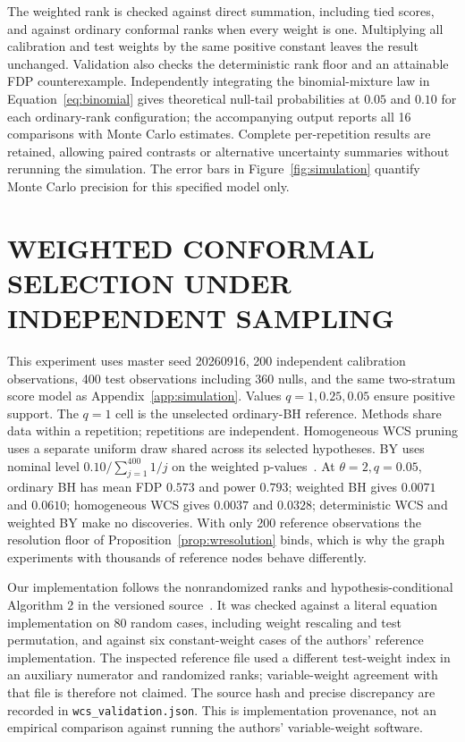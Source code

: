 \documentclass[twoside]{article}
\begin{document}
The weighted rank is checked against direct summation, including tied scores, and against ordinary conformal ranks when every weight is one. Multiplying all calibration and test weights by the same positive constant leaves the result unchanged. Validation also checks the deterministic rank floor and an attainable FDP counterexample. Independently integrating the binomial-mixture law in Equation~\eqref{eq:binomial} gives theoretical null-tail probabilities at $0.05$ and $0.10$ for each ordinary-rank configuration; the accompanying output reports all 16 comparisons with Monte Carlo estimates. Complete per-repetition results are retained, allowing paired contrasts or alternative uncertainty summaries without rerunning the simulation. The error bars in Figure~\ref{fig:simulation} quantify Monte Carlo precision for this specified model only.

\section{WEIGHTED CONFORMAL SELECTION UNDER INDEPENDENT SAMPLING}
\label{app:wcs}
\begin{table}[t]
\centering\small
\caption{Complete WCS comparison under independent sampling. FDP entries give mean (Monte Carlo SE) over 2,000 independent repetitions; power entries are means. At $q=1$, ordinary and weighted BH and both WCS variants coincide in this simulation. Zero-discovery runs are retained.}

\end{table}
This experiment uses master seed 20260916, 200 independent calibration observations, 400 test observations including 360 nulls, and the same two-stratum score model as Appendix~\ref{app:simulation}. Values $q=1,0.25,0.05$ ensure positive support. The $q=1$ cell is the unselected ordinary-BH reference. Methods share data within a repetition; repetitions are independent. Homogeneous WCS pruning uses a separate uniform draw shared across its selected hypotheses. BY uses nominal level $0.10/\sum_{j=1}^{400}1/j$ on the weighted p-values~\citep{benjamini2001control}. At $\theta=2,q=0.05$, ordinary BH has mean FDP $0.573$ and power $0.793$; weighted BH gives $0.0071$ and $0.0610$; homogeneous WCS gives $0.0037$ and $0.0328$; deterministic WCS and weighted BY make no discoveries. With only 200 reference observations the resolution floor of Proposition~\ref{prop:wresolution} binds, which is why the graph experiments with thousands of reference nodes behave differently.

Our implementation follows the nonrandomized ranks and hypothesis-conditional Algorithm 2 in the versioned source~\citep{jin2023algorithm}. It was checked against a literal equation implementation on 80 random cases, including weight rescaling and test permutation, and against six constant-weight cases of the authors' reference implementation. The inspected reference file used a different test-weight index in an auxiliary numerator and randomized ranks; variable-weight agreement with that file is therefore not claimed. The source hash and precise discrepancy are recorded in \texttt{wcs\_validation.json}. This is implementation provenance, not an empirical comparison against running the authors' variable-weight software.
\end{document}
